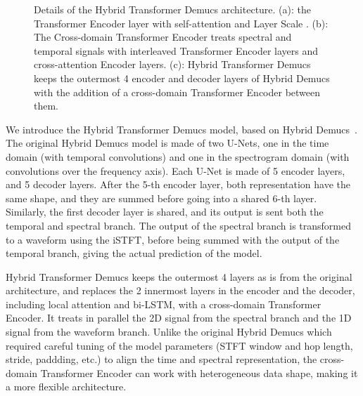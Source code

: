 \documentclass{article}
\begin{document}
\begin{figure}[h]
    \caption{Details of the Hybrid Transformer Demucs architecture. (a): the Transformer Encoder layer
        with self-attention and Layer Scale \cite{layerscale}. (b): The Cross-domain Transformer Encoder treats spectral and temporal signals with interleaved Transformer Encoder layers and cross-attention Encoder layers. (c): Hybrid Transformer Demucs keeps the outermost 4 encoder and decoder layers of Hybrid Demucs with the addition of a cross-domain Transformer Encoder between them.}
    \label{fig:architecture}%
\end{figure}

We introduce the Hybrid Transformer Demucs model, based on Hybrid Demucs~\cite{defossez2021hybrid}.
The original Hybrid Demucs model is made of two U-Nets, one in the time domain (with temporal convolutions) and
one in the spectrogram domain (with convolutions over the frequency axis). 
Each U-Net is made of 5 encoder layers, and 5 decoder layers. After the 5-th encoder layer, both representation
have the same shape, and they are summed before going into a shared 6-th layer. Similarly, the first decoder layer is shared, and
its output is sent both the temporal and spectral branch. The output of the spectral branch
is transformed to a waveform using the iSTFT, before being summed with the output of the temporal branch, giving the 
actual prediction of the model.

Hybrid Transformer Demucs keeps the outermost 4 layers as is from the original architecture, and replaces the 2 innermost layers in the encoder and the decoder, including local attention and bi-LSTM, with
a cross-domain Transformer Encoder.
It treats in parallel the 2D signal from the spectral branch and the 1D signal from the waveform branch. 
Unlike the original Hybrid Demucs which required careful tuning of the model parameters (STFT window and hop length, stride, paddding, etc.) to align the time and spectral representation, the cross-domain
Transformer Encoder can work with heterogeneous data shape, making it a more flexible architecture.
\end{document}
